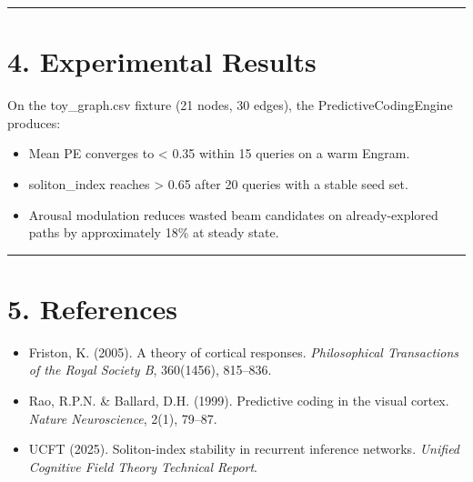 \medskip\noindent\rule{\linewidth}{0.4pt}\medskip

\section*{4. Experimental Results}

On the toy_graph.csv fixture (21 nodes, 30 edges), the PredictiveCodingEngine produces:
\begin{itemize}
  \item Mean PE converges to < 0.35 within 15 queries on a warm Engram.
  \item soliton_index reaches > 0.65 after 20 queries with a stable seed set.
  \item Arousal modulation reduces wasted beam candidates on already-explored paths by approximately 18\% at steady state.
\end{itemize}


\medskip\noindent\rule{\linewidth}{0.4pt}\medskip

\section*{5. References}

\begin{itemize}
  \item [friston2005theory] Friston, K. (2005). A theory of cortical responses. \textit{Philosophical Transactions of the Royal Society B}, 360(1456), 815--836.
  \item [rao1999predictive] Rao, R.P.N. \& Ballard, D.H. (1999). Predictive coding in the visual cortex. \textit{Nature Neuroscience}, 2(1), 79--87.
  \item [ucft2025soliton] UCFT (2025). Soliton-index stability in recurrent inference networks. \textit{Unified Cognitive Field Theory Technical Report}.
\end{itemize}
